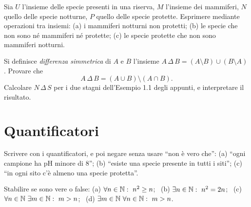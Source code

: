 \begin{esercizio}[\liv{1}]
Sia $U$ l'insieme delle specie presenti in una riserva, $M$ l'insieme dei mammiferi, $N$ quello delle specie notturne, $P$ quello delle specie protette. Esprimere mediante operazioni tra insiemi: (a) i mammiferi notturni non protetti; (b) le specie che non sono n\'e mammiferi n\'e protette; (c) le specie protette che non sono mammiferi notturni.
\end{esercizio}

\begin{esercizio}[\liv{2}]
Si definisce \textit{differenza simmetrica} di $A$ e $B$ l'insieme $A\,\Delta\,B=(A\setminus B)\cup(B\setminus A)$. Provare che
\[
A\,\Delta\,B=(A\cup B)\setminus(A\cap B).
\]
Calcolare $N\,\Delta\,S$ per i due stagni dell'Esempio 1.1 degli appunti, e interpretare il risultato.
\end{esercizio}

\section{Quantificatori}

\begin{esercizio}[\liv{1}]
Scrivere con i quantificatori, e poi negare senza usare ``non è vero che'':
(a) ``ogni campione ha pH minore di $8$''; (b) ``esiste una specie presente in tutti i siti''; (c) ``in ogni sito c'è almeno una specie protetta''.
\end{esercizio}

\begin{esercizio}[\liv{1}]
Stabilire se sono vere o false:
(a) $\forall n\in\mathbb N:\ n^2\ge n$; \ (b) $\exists n\in\mathbb N:\ n^2=2n$; \ (c) $\forall n\in\mathbb N\ \exists m\in\mathbb N:\ m>n$; \ (d) $\exists m\in\N\ \forall n\in\N:\ m>n$.
\end{esercizio}

